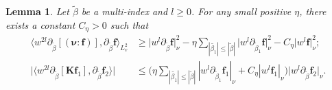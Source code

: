 \documentclass[reqno]{amsart}
\numberwithin{equation}{section}
\numberwithin{equation}{section}
\newtheorem{lema}[thm]{Lemma}
\begin{document}
	
	\begin{lema}\label{222maxdel}
		Let $\tilde{\beta}$ be  a multi-index and $l\geq0$. For any small positive $\eta$, there exists a  constant $C_{\eta}>0$ such that
		\begin{align}
			\big\langle w^{2l}  \partial_{\tilde{\beta}}[(\bm{\nu}:\mathbf{f})], \partial_{\tilde{\beta}} \mathbf{f} \big\rangle_{L_v^2} 
			&\geq  \big|w^{l}\partial_{\tilde{\beta}}\mathbf{f}\big|^2_{\nu}-\eta \sum_{|\tilde{\beta_1}|\leq|\tilde{\beta}|}\big|w^{l}\partial_{\tilde{\beta}_1}\mathbf{f}\big|^2_{\nu}-C_{\eta}\big|w^{l}\mathbf{f}\big|^2_{\nu};\label{lem24252tep}\\
			\big| \big\langle w^{2l} \partial_{\tilde{\beta}}[\mathbf{K} \mathbf{f}_1], \partial_{\tilde{\beta}} \mathbf{f}_2 \big\rangle\big| 
			&\leq \Bigg(\eta\sum_{|\tilde{\beta_1}|\leq|\tilde{\beta}|}|w^{l}\partial_{\tilde{\beta}_1}\mathbf{f}_1|_{\nu}+C_{\eta}|w^{l}\mathbf{f}_1|_{\nu}\Bigg)\big|w^{l}\partial_{\tilde{\beta}}\mathbf{f}_2\big|_{\nu}.\label{lem24253tep}
		\end{align}
	\end{lema}
\end{document}
